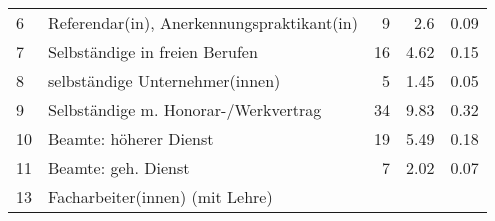\begin{longtable}{lXrrr}
     6 &
     \multicolumn{1}{X}{ Referendar(in), Anerkennungspraktikant(in)   } &


       \num{9} &
       \num[round-mode=places,round-precision=2]{2.6} &
         \num[round-mode=places,round-precision=2]{0.09} \\

     7 &
     \multicolumn{1}{X}{ Selbständige in freien Berufen   } &


       \num{16} &
       \num[round-mode=places,round-precision=2]{4.62} &
         \num[round-mode=places,round-precision=2]{0.15} \\

     8 &
     \multicolumn{1}{X}{ selbständige Unternehmer(innen)   } &


       \num{5} &
       \num[round-mode=places,round-precision=2]{1.45} &
         \num[round-mode=places,round-precision=2]{0.05} \\

     9 &
     \multicolumn{1}{X}{ Selbständige m. Honorar-/Werkvertrag   } &


       \num{34} &
       \num[round-mode=places,round-precision=2]{9.83} &
         \num[round-mode=places,round-precision=2]{0.32} \\

     10 &
     \multicolumn{1}{X}{ Beamte: höherer Dienst   } &


       \num{19} &
       \num[round-mode=places,round-precision=2]{5.49} &
         \num[round-mode=places,round-precision=2]{0.18} \\

     11 &
     \multicolumn{1}{X}{ Beamte: geh. Dienst   } &


       \num{7} &
       \num[round-mode=places,round-precision=2]{2.02} &
         \num[round-mode=places,round-precision=2]{0.07} \\

     13 &
     \multicolumn{1}{X}{ Facharbeiter(innen) (mit Lehre)   } &



\end{longtable}
